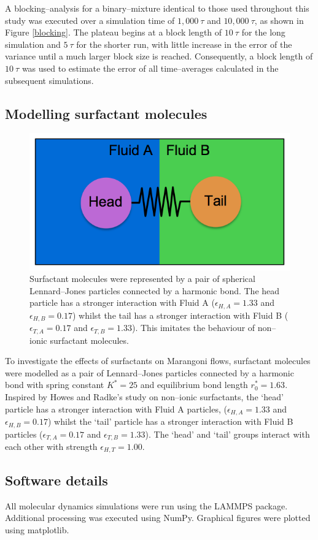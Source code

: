 A blocking--analysis for a binary--mixture identical to those used throughout this study was executed over a simulation time of $1,000\ \tau$ and $10,000\ \tau$, as shown in Figure \ref{blocking}.
The plateau begins at a block length of $10\ \tau$ for the long simulation and $5\ \tau$ for the shorter run, with little increase in the error of the variance until a much larger block size is reached.
Consequently, a block length of $10\ \tau$ was used to estimate the error of all time--averages calculated in the subsequent simulations.
\FloatBarrier

\subsection{Modelling surfactant molecules}\label{ModellingSurfactants}
\begin{figure}[h]
\centering
\includegraphics[scale=0.4]{surfactant.png}
\caption{Surfactant molecules were represented by a pair of spherical Lennard--Jones particles connected by a harmonic bond. 
The head particle has a stronger interaction with Fluid A ($\epsilon_{H, A} = 1.33$ and $\epsilon_{H, B} = 0.17$) whilst the tail has a stronger interaction with Fluid B ($\epsilon_{T, A} = 0.17$ and $\epsilon_{T, B} = 1.33$).
This imitates the behaviour of non--ionic surfactant molecules.
 }
\label{surfactant}
\end{figure}
To investigate the effects of surfactants on Marangoni flows, surfactant molecules were modelled as a pair of Lennard--Jones particles connected by a harmonic bond with spring constant $K^{*} = 25$ and equilibrium bond length $r^{*}_{0}=1.63$.
Inspired by Howes and Radke's study on non--ionic surfactants,\cite{HowesSurfactant} the `head' particle has a stronger interaction with Fluid A particles, ($\epsilon_{H, A} = 1.33$ and $\epsilon_{H, B} = 0.17$) whilst the `tail' particle has a stronger interaction with Fluid B particles ($\epsilon_{T, A} = 0.17$ and $\epsilon_{T, B} = 1.33$).
The `head' and `tail' groups interact with each other with strength $\epsilon_{H, T} = 1.00$.
\FloatBarrier

\subsection{Software details}\label{SoftwareDetails}
All molecular dynamics simulations were run using the LAMMPS package.\cite{LAMMPS}
Additional processing was executed using NumPy.\cite{NumPy}
Graphical figures were plotted using matplotlib.\cite{MatPlotLib}

